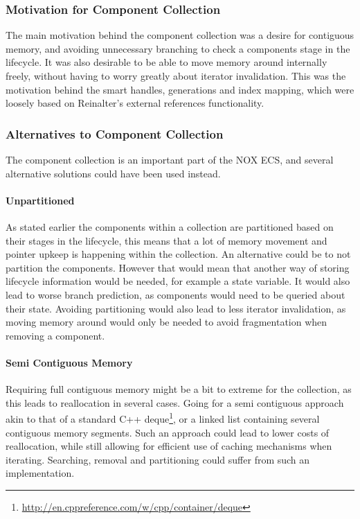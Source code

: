 \subsubsection{Motivation for Component Collection}
The main motivation behind the component collection was a desire for contiguous memory, and avoiding unnecessary
branching to check a components stage in the lifecycle.
It was also desirable to be able to move memory around internally freely, without having to worry greatly about
iterator invalidation. This was the motivation behind the smart handles, generations and index mapping, which were loosely based
on Reinalter\cite{molecular_matters_dod_external_references}'s external references functionality.

\subsubsection{Alternatives to Component Collection}
The component collection is an important part of the NOX ECS, and several alternative solutions could have been used instead.

\paragraph{Unpartitioned}
As stated earlier the components within a collection are partitioned based on their stages in the lifecycle,
this means that a lot of memory movement and pointer upkeep is happening within the collection.
An alternative could be to not partition the components. However that would mean that another way of storing
lifecycle information would be needed, for example a state variable.
It would also lead to worse branch prediction, as components would need to be queried about their state.
Avoiding partitioning would also lead to less iterator invalidation, as moving memory around would
only be needed to avoid fragmentation when removing a component.

\paragraph{Semi Contiguous Memory}
Requiring full contiguous memory might be a bit to extreme for the collection, as this leads to
reallocation in several cases. Going for a semi contiguous approach akin to that of a standard C++ deque\footnote{\url{http://en.cppreference.com/w/cpp/container/deque}},
or a linked list containing several contiguous memory segments.
Such an approach could lead to lower costs of reallocation, while still allowing for efficient use of caching mechanisms
when iterating.
Searching, removal and partitioning could suffer from such an implementation.

